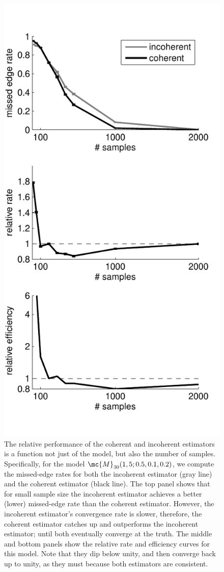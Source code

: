\documentclass[10pt,journal,cspaper,compsoc]{IEEEtran}
\begin{document}
\begin{figure}[htbp]
	\centering
		\includegraphics[width=1.0\linewidth]{../figs/RE_V30_s5_p10_q20.pdf}
	\caption{The relative performance of the coherent and incoherent estimators is a function not just of the model, but also the number of samples.  Specifically, for the model $\mc{M}_{30}(1,5;0.5,0.1,0.2)$, we compute the missed-edge rates for both the incoherent estimator (gray line) and the coherent estimator (black line).  The top panel shows that for small sample size the incoherent estimator achieves a better (lower) missed-edge rate than the coherent estimator. However, the incoherent estimator's convergence rate is slower, therefore, the coherent estimator catches up and outperforms the incoherent estimator; until both eventually converge at the truth.  The middle and bottom panels show the relative rate and efficiency curves for this model. Note that they dip below unity, and then converge back up to unity, as they must because both estimators are consistent. }

\end{figure}
\end{document}
